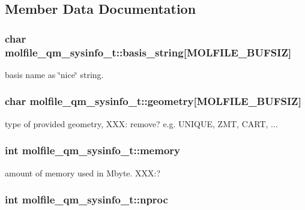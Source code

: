 \subsection{\-Member \-Data \-Documentation}
\hypertarget{structmolfile__qm__sysinfo__t_afab62a79c9f1fc05307afb1ce061ef7d}{
\subsubsection[{basis\-\_\-string}]{\setlength{\rightskip}{0pt plus 5cm}char {\bf molfile\-\_\-qm\-\_\-sysinfo\-\_\-t\-::basis\-\_\-string}\mbox{[}{\bf \-M\-O\-L\-F\-I\-L\-E\-\_\-\-B\-U\-F\-S\-I\-Z}\mbox{]}}}\label{structmolfile__qm__sysinfo__t_afab62a79c9f1fc05307afb1ce061ef7d}
basis name as \char`\"{}nice\char`\"{} string. \hypertarget{structmolfile__qm__sysinfo__t_a321d21921b2358bf642687935a8e3a07}{
\subsubsection[{geometry}]{\setlength{\rightskip}{0pt plus 5cm}char {\bf molfile\-\_\-qm\-\_\-sysinfo\-\_\-t\-::geometry}\mbox{[}{\bf \-M\-O\-L\-F\-I\-L\-E\-\_\-\-B\-U\-F\-S\-I\-Z}\mbox{]}}}\label{structmolfile__qm__sysinfo__t_a321d21921b2358bf642687935a8e3a07}
type of provided geometry, \-X\-X\-X\-: remove? e.\-g. \-U\-N\-I\-Q\-U\-E, \-Z\-M\-T, \-C\-A\-R\-T, ... \hypertarget{structmolfile__qm__sysinfo__t_a45b68b0f4992722d252ed143a8113981}{
\subsubsection[{memory}]{\setlength{\rightskip}{0pt plus 5cm}int {\bf molfile\-\_\-qm\-\_\-sysinfo\-\_\-t\-::memory}}}\label{structmolfile__qm__sysinfo__t_a45b68b0f4992722d252ed143a8113981}
amount of memory used in \-Mbyte. \-X\-X\-X\-:? \hypertarget{structmolfile__qm__sysinfo__t_a5cae7d1af0e8e824450a7f7c0c645a00}{
\subsubsection[{nproc}]{\setlength{\rightskip}{0pt plus 5cm}int {\bf molfile\-\_\-qm\-\_\-sysinfo\-\_\-t\-::nproc}}}\label{structmolfile__qm__sysinfo__t_a5cae7d1af0e8e824450a7f7c0c645a00}
